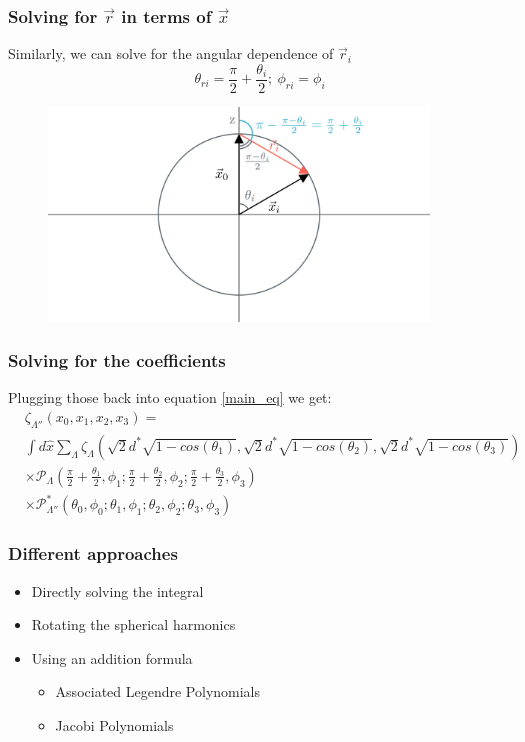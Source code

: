 \documentclass{beamer}
\begin{document}
    \begin{frame}
        \frametitle{Solving for $\vec r$ in terms of $\vec x$}
        Similarly, we can solve for the angular dependence of $\vec r_i$\\
        \begin{equation*}
            \boxed{\theta_{ri} = \frac{\pi}{2} + \frac{\theta_i}{2}; \ \phi_{ri} = \phi_i}
        \end{equation*}
        \begin{figure}
            \centering
                \includegraphics[width=0.9\textwidth]{media/angle_conversion_diagram_1_ManimCE_v0.17.3.png}
            \end{figure}
    \end{frame}

    \begin{frame}
        \frametitle{Solving for the coefficients}
        Plugging those back into equation \ref{main_eq} we get:
        \begin{align*}
            &\zeta_{\Lambda ''}(x_0, x_1, x_2, x_3) =\\
            &\int d \hat x \sum_{\Lambda} \zeta_{\Lambda}(\sqrt{2}d^*\sqrt{1-cos(\theta_1)}, \sqrt{2}d^*\sqrt{1-cos(\theta_2)}, \sqrt{2}d^*\sqrt{1-cos(\theta_3)})\\
            &\times \mathcal P_{\Lambda}(\frac{\pi}{2} + \frac{\theta_1}{2}, \phi_1; \frac{\pi}{2} + \frac{\theta_2}{2}, \phi_2; \frac{\pi}{2} + \frac{\theta_3}{2}, \phi_3)\\
            &\times \mathcal P^*_{\Lambda ''}(\theta_0, \phi_0; \theta_1, \phi_1; \theta_2, \phi_2; \theta_3, \phi_3)
        \end{align*}
    \end{frame}

    \begin{frame}
        \frametitle{Different approaches}
        \begin{itemize}
            \item Directly solving the integral
            \item Rotating the spherical harmonics
            \item Using an addition formula
            \begin{itemize}
                \item Associated Legendre Polynomials
                \item Jacobi Polynomials
            \end{itemize}
        \end{itemize}
    \end{frame}
\end{document}
